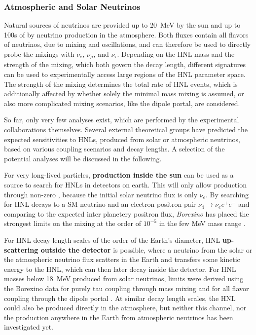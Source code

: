 \subsubsection{Atmospheric and Solar Neutrinos}

Natural sources of neutrinos are provided up to \SI{20}{\mega\electronvolt} by the sun and up to 100s of \si{\gev} by neutrino production in the atmosphere. Both fluxes contain all flavors of neutrinos, due to mixing and oscillations, and can therefore be used to directly probe the mixings with $\nu_e$, $\nu_\mu$, and $\nu_\tau$. Depending on the HNL mass and the strength of the mixing, which both govern the decay length, different signatures can be used to experimentally access large regions of the HNL parameter space. The strength of the mixing determines the total rate of HNL events, which is additionally affected by whether solely the minimal mass mixing is assumed, or also more complicated mixing scenarios, like the dipole portal, are considered.

So far, only very few analyses exist, which are performed by the experimental collaborations themselves. Several external theoretical groups have predicted the expected sensitivities to HNLs, produced from solar or atmospheric neutrinos, based on various coupling scenarios and decay lengths. A selection of the potential analyses will be discussed in the following.

For very long-lived particles, \textbf{production inside the sun} can be used as a source to search for HNLs in detectors on earth. This will only allow production through non-zero , because the initial solar neutrino flux is only $\nu_e$. By searching for HNL decays to a SM neutrino and an electron positron pair $\nu_4 \rightarrow \nu_e e^+ e^-$ and comparing to the expected inter planetery positron flux, \textit{Borexino} has placed the strongest limits on the mixing  at the order of $10^{-5}$ in the few \si{\mega\electronvolt} mass range .

For HNL decay length scales of the order of the Earth's diameter, HNL \textbf{up-scattering outside the detector} is possible, where a neutrino from the solar or the atmospheric neutrino flux scatters in the Earth and transfers some kinetic energy to the HNL, which can then later decay inside the detector. For HNL masses below \SI{18}{\mega\electronvolt} produced from solar neutrinos, limits were derived using the Borexino data for purely tau coupling through mass mixing  and for all flavor coupling through the dipole portal . At similar decay length scales, the HNL could also be produced directly in the atmosphere, but neither this channel, nor the production anywhere in the Earth from atmospheric neutrinos has been investigated yet.

